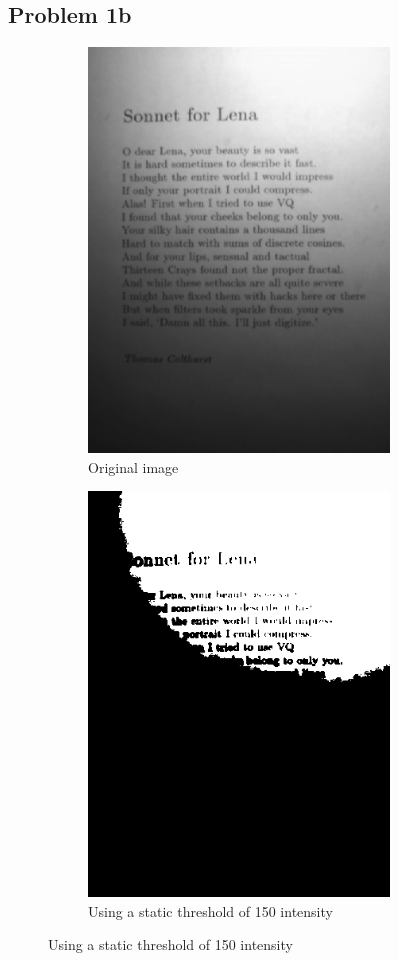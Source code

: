 \documentclass{math}
\begin{document}
\subsection*{Problem 1b}
\begin{figure}[H]
  \begin{subfigure}{0.5\linewidth}
    \centering
    \includegraphics[width=8cm]{assets/hw_01_sonnet_original.png}
    \caption{Original image}
  \end{subfigure}
  \begin{subfigure}{0.5\linewidth}
    \centering
    \includegraphics[width=8cm]{assets/hw_01_static_threshold.png}
    \caption{Using a static threshold of 150 intensity}
  \end{subfigure}
\end{figure}
\end{document}
